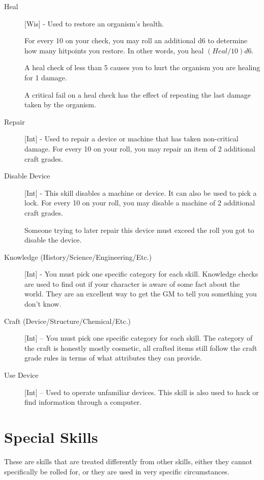 \begin{description}
\item[Heal] [Wis] - Used to restore an organism's health.

For every 10 on your check, you may roll an additional d6 to determine how many hitpoints you restore. In other words, you heal $(Heal/10)d6$.

A heal check of less than 5 causes you to hurt the organism you are healing for 1 damage.

A critical fail on a heal check has the effect of repeating the last damage taken by the organism.

\item[Repair] [Int] - Used to repair a device or machine that has taken non-critical damage. For every 10 on your roll, you may repair an item of 2 additional craft grades.

\item[Disable Device] [Int] - This skill disables a machine or device. It can also be used to pick a lock. For every 10 on your roll, you may disable a machine of 2 additional craft grades.

Someone trying to later repair this device must exceed the roll you got to disable the device.

\item[Knowledge (History/Science/Engineering/Etc.)] [Int] - You must pick one specific category for each skill. Knowledge checks are used to find out if your character is aware of some fact about the world. They are an excellent way to get the GM to tell you something you don’t know.
\item[Craft (Device/Structure/Chemical/Etc.)] [Int] – You must pick one specific category for each skill. The category of the craft is honestly mostly cosmetic, all crafted items still follow the craft grade rules in terms of what attributes they can provide.
\item[Use Device] [Int] – Used to operate unfamiliar devices. This skill is also used to hack or find information through a computer.
\end{description}

\section{Special Skills}
These are skills that are treated differently from other skills, either they cannot specifically be rolled for, or they are used in very specific circumstances.

